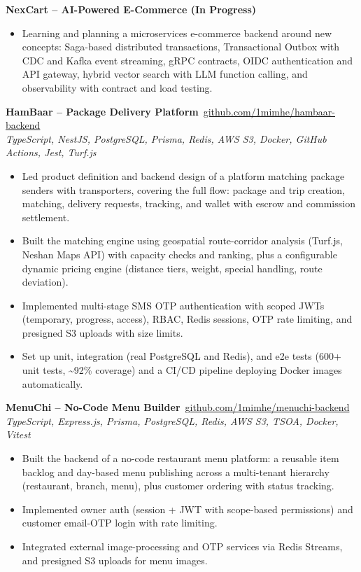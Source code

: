 \documentclass[a4paper,10pt]{article}
\newcommand{\projectheader}[4]{%
  \noindent\textbf{#1}\hfill{\small\faGithub\ \href{#2}{#3}}\\[-2pt]
  {\small\color{medgray}\textit{#4}}
  \vspace{2pt}
}
\newcommand{\projecttitle}[1]{%
  \noindent\textbf{#1}
  \vspace{2pt}
}
\begin{document}
\vspace{4pt}

\projecttitle
  {NexCart -- AI-Powered E-Commerce (In Progress)}

\begin{itemize}
  \item Learning and planning a microservices e-commerce backend around new concepts: Saga-based distributed transactions, Transactional Outbox with CDC and Kafka event streaming, gRPC contracts, OIDC authentication and API gateway, hybrid vector search with LLM function calling, and observability with contract and load testing.
\end{itemize}\newpage

\projectheader
  {HamBaar -- Package Delivery Platform}
  {https://github.com/1mimhe/hambaar-backend}
  {github.com/1mimhe/hambaar-backend}
  {TypeScript, NestJS, PostgreSQL, Prisma, Redis, AWS S3, Docker, GitHub Actions, Jest, Turf.js}

\begin{itemize}
  \item Led product definition and backend design of a platform matching package senders with transporters, covering the full flow: package and trip creation, matching, delivery requests, tracking, and wallet with escrow and commission settlement.
  \item Built the matching engine using geospatial route-corridor analysis (Turf.js, Neshan Maps API) with capacity checks and ranking, plus a configurable dynamic pricing engine (distance tiers, weight, special handling, route deviation).
  \item Implemented multi-stage SMS OTP authentication with scoped JWTs (temporary, progress, access), RBAC, Redis sessions, OTP rate limiting, and presigned S3 uploads with size limits.
  \item Set up unit, integration (real PostgreSQL and Redis), and e2e tests (600+ unit tests, \textasciitilde 92\% coverage) and a CI/CD pipeline deploying Docker images automatically.
\end{itemize}

\vspace{4pt}

\projectheader
  {MenuChi -- No-Code Menu Builder}
  {https://github.com/1mimhe/menuchi-backend}
  {github.com/1mimhe/menuchi-backend}
  {TypeScript, Express.js, Prisma, PostgreSQL, Redis, AWS S3, TSOA, Docker, Vitest}

\begin{itemize}
  \item Built the backend of a no-code restaurant menu platform: a reusable item backlog and day-based menu publishing across a multi-tenant hierarchy (restaurant, branch, menu), plus customer ordering with status tracking.
  \item Implemented owner auth (session + JWT with scope-based permissions) and customer email-OTP login with rate limiting.
  \item Integrated external image-processing and OTP services via Redis Streams, and presigned S3 uploads for menu images.
\end{itemize}
\end{document}
